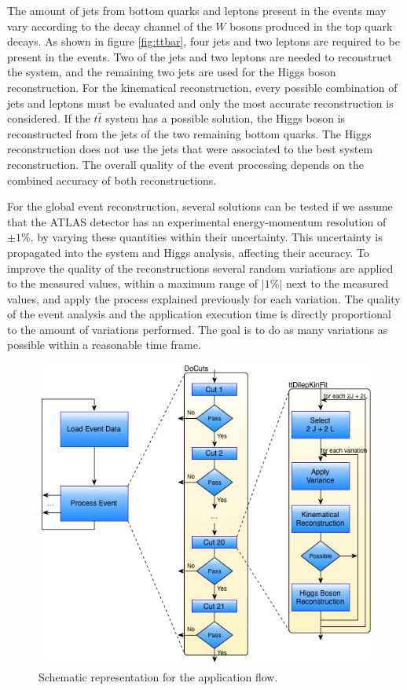 The amount of jets from bottom quarks and leptons present in the events may vary according to the decay channel of the $W$ bosons produced in the top quark decays. As shown in figure \ref{fig:ttbar}, four jets and two leptons are required to be present in the events. Two of the jets and two leptons are needed to reconstruct the \ttbar system, and the remaining two jets are used for the Higgs boson reconstruction. For the kinematical reconstruction, every possible combination of jets and leptons must be evaluated and only the most accurate reconstruction is considered. If the $t\bar{t}$ system has a possible solution, the Higgs boson is reconstructed from the jets of the two remaining bottom quarks. The Higgs reconstruction does not use the jets that were associated to the best \ttbar system reconstruction. The overall quality of the event processing depends on the combined accuracy of both reconstructions.

For the global event reconstruction, several solutions can be tested if we assume that the ATLAS detector has an experimental energy-momentum resolution of $\pm1\%$, by varying these quantities within their uncertainty. This uncertainty is propagated into the \ttbar system and Higgs analysis, affecting their accuracy. To improve the quality of the reconstructions several random variations are applied to the measured values, within a maximum range of $|1\%|$ next to the measured values, and apply the process explained previously for each variation. The quality of the event analysis and the application execution time is directly proportional to the amount of variations performed. The goal is to do as many variations as possible within a reasonable time frame.

\begin{figure}[!htp]
	\begin{center}
		\includegraphics[scale=0.5]{imgs/graf_abstract_flow_with_kinfit.png}
		\caption{Schematic representation for the \tth application flow.}
		\label{fig:flow}
	\end{center}
\end{figure}

